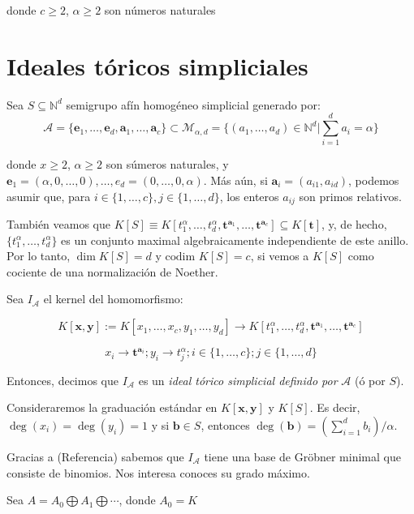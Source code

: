 donde $ c \geq 2 $, $ \alpha \geq 2 $ son números naturales

\section{Ideales tóricos simpliciales}

Sea $S \subseteq \mathbb{N}^d$ semigrupo afín homogéneo simplicial generado por:
$$\mathcal{A}=\{\textbf{e}_1,\dots,\textbf{e}_d, \textbf{a}_1, \dots, \textbf{a}_c\} \subset \mathcal{M}_{\alpha, d} = \{(a_1, \dots, a_d) \in \mathbb{N}^d | \sum_{i=1}^d a_i = \alpha\}$$

donde $x \geq 2$, $\alpha \geq 2$ son súmeros naturales, y $\mathbf{e}_1 = (\alpha, 0, \dots, 0), \dots, {e}_d = (0,\dots, 0, \alpha)$. Más aún, si $\mathbf{a}_i = (a_{i1}, a_{id})$, podemos asumir que, para $i \in \{1,\dots,c\}, j \in \{1,\dots, d\}$, los enteros $a_{ij}$ son primos relativos. 

También veamos que $K[S] \equiv K[t_1^\alpha, \dots, t_d^\alpha, \mathbf{t}^{\mathbf{a}_1}, \dots, \mathbf{t}^{\mathbf{a}_c}] \subseteq K[\textbf{t}]$, y, de hecho, $\{t_1^{\alpha},\dots,t_d^{\alpha}\}$ es un conjunto maximal algebraicamente independiente de este anillo. Por lo tanto, $\dim K[S] = d$ y $\textrm{codim }K[S] = c$, si vemos a $K[S]$ como cociente de una normalización de Noether.

\begin{definition}
Sea $I_{\mathcal{A}}$ el kernel del homomorfismo:

$$K[\mathbf{x}, \mathbf{y}] := K[x_1, \dots, x_c, y_1, \dots, y_d] \rightarrow K[t_1^\alpha, \dots, t_d^\alpha, \mathbf{t}^{\mathbf{a}_1}, \dots, \mathbf{t}^{\mathbf{a}_c}]$$

$$x_i \rightarrow \textbf{t}^{\textbf{a}_i}; y_i \rightarrow t_j^\alpha; i \in \{1,\dots, c\}; j \in \{1,\dots, d\}$$

Entonces, decimos que $I_{\mathcal{A}}$ es un \emph{ideal tórico simplicial definido por} $\mathcal{A}$ (ó por $S$). 
\end{definition}

Consideraremos la graduación estándar en $K[\textbf{x}, \textbf{y}]$ y $K[S]$. Es decir, $\deg(x_i) = \deg(y_i) = 1$ y si $\mathbf{b} \in S$, entonces $\deg(\mathbf{b}) = (\sum_{i=1}^d b_i)/\alpha$.

Gracias a (Referencia) sabemos que $I_{\mathcal{A}}$ tiene una base de Gröbner minimal que consiste de binomios. Nos interesa conoces su grado máximo.

Sea $A = A_0 \bigoplus A_1 \bigoplus \cdots$, donde $A_0 = K$
